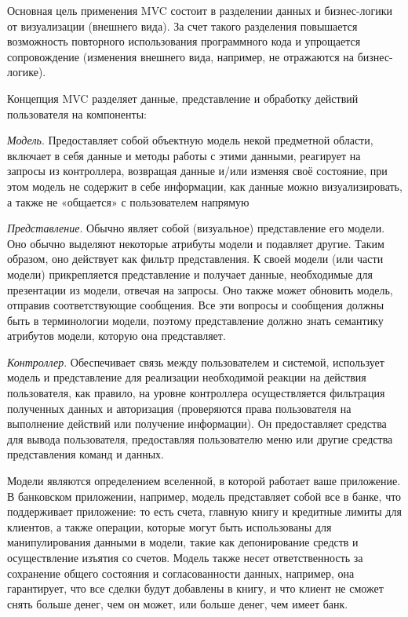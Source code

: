 Основная цель применения MVC состоит в разделении данных и бизнес-логики от визуализации (внешнего вида). За счет такого разделения повышается возможность повторного использования программного кода и упрощается сопровождение (изменения внешнего вида, например, не отражаются на бизнес-логике).

Концепция MVC разделяет данные, представление и обработку действий пользователя на компоненты:

\textit{Модель}. Предоставляет собой объектную модель некой предметной области, включает в себя данные и методы работы с этими данными, реагирует на запросы из контроллера, возвращая данные и/или изменяя своё состояние, при этом модель не содержит в себе информации, как данные можно визуализировать, а также не «общается» с пользователем напрямую

\textit{Представление}. Обычно являет собой (визуальное) представление его модели. Оно обычно выделяют некоторые атрибуты модели и подавляет другие. Таким образом, оно действует как фильтр представления. К своей модели (или части модели) прикрепляется представление и получает данные, необходимые для презентации из модели, отвечая на запросы. Оно также может обновить модель, отправив соответствующие сообщения. Все эти вопросы и сообщения должны быть в терминологии модели, поэтому представление должно знать семантику атрибутов модели, которую она представляет.

\textit{Контроллер}. Обеспечивает связь между пользователем и системой, использует модель и представление для реализации необходимой реакции на действия пользователя, как правило, на уровне контроллера осуществляется фильтрация полученных данных и авторизация (проверяются права пользователя на выполнение действий или получение информации).  Он предоставляет средства для вывода пользователя, предоставляя пользователю меню или другие средства представления команд и данных.

Модели являются определением вселенной, в которой работает ваше приложение. В банковском приложении, например, модель представляет собой все в банке, что поддерживает приложение: то есть счета, главную книгу и кредитные лимиты для клиентов, а также операции, которые могут быть использованы для манипулирования данными в модели, такие как депонирование средств и осуществление изъятия со счетов. Модель также несет ответственность за сохранение общего состояния и согласованности данных, например, она гарантирует, что все сделки будут добавлены в книгу, и что клиент не сможет снять больше денег, чем он может, или больше денег, чем имеет банк.

